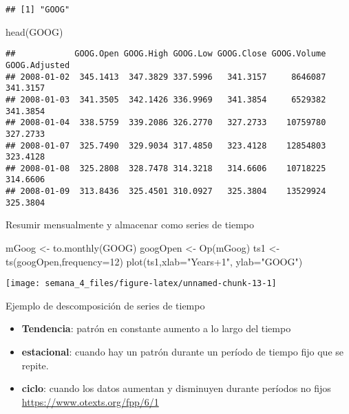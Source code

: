 \documentclass[
]{article}
\newenvironment{Shaded}{\begin{snugshade}}{\end{snugshade}}
\newcommand{\AttributeTok}[1]{\textcolor[rgb]{0.77,0.63,0.00}{#1}}
\newcommand{\DecValTok}[1]{\textcolor[rgb]{0.00,0.00,0.81}{#1}}
\newcommand{\FunctionTok}[1]{\textcolor[rgb]{0.00,0.00,0.00}{#1}}
\newcommand{\NormalTok}[1]{#1}
\newcommand{\OtherTok}[1]{\textcolor[rgb]{0.56,0.35,0.01}{#1}}
\newcommand{\StringTok}[1]{\textcolor[rgb]{0.31,0.60,0.02}{#1}}
\providecommand{\tightlist}{%
  \setlength{\itemsep}{0pt}\setlength{\parskip}{0pt}}
\begin{document}
\begin{verbatim}
## [1] "GOOG"
\end{verbatim}

\begin{Shaded}
\begin{Highlighting}[]
\FunctionTok{head}\NormalTok{(GOOG)}
\end{Highlighting}
\end{Shaded}

\begin{verbatim}
##            GOOG.Open GOOG.High GOOG.Low GOOG.Close GOOG.Volume GOOG.Adjusted
## 2008-01-02  345.1413  347.3829 337.5996   341.3157     8646087      341.3157
## 2008-01-03  341.3505  342.1426 336.9969   341.3854     6529382      341.3854
## 2008-01-04  338.5759  339.2086 326.2770   327.2733    10759780      327.2733
## 2008-01-07  325.7490  329.9034 317.4850   323.4128    12854803      323.4128
## 2008-01-08  325.2808  328.7478 314.3218   314.6606    10718225      314.6606
## 2008-01-09  313.8436  325.4501 310.0927   325.3804    13529924      325.3804
\end{verbatim}

Resumir mensualmente y almacenar como series de tiempo

\begin{Shaded}
\begin{Highlighting}[]
\NormalTok{mGoog }\OtherTok{\textless{}{-}} \FunctionTok{to.monthly}\NormalTok{(GOOG)}
\NormalTok{googOpen }\OtherTok{\textless{}{-}} \FunctionTok{Op}\NormalTok{(mGoog)}
\NormalTok{ts1 }\OtherTok{\textless{}{-}} \FunctionTok{ts}\NormalTok{(googOpen,}\AttributeTok{frequency=}\DecValTok{12}\NormalTok{)}
\FunctionTok{plot}\NormalTok{(ts1,}\AttributeTok{xlab=}\StringTok{"Years+1"}\NormalTok{, }\AttributeTok{ylab=}\StringTok{"GOOG"}\NormalTok{)}
\end{Highlighting}
\end{Shaded}

\begin{center}\texttt{[image: semana\_4\_files/figure-latex/unnamed-chunk-13-1]} \end{center}

Ejemplo de descomposición de series de tiempo

\begin{itemize}
\tightlist
\item
  \textbf{Tendencia}: patrón en constante aumento a lo largo del tiempo
\item
  \textbf{estacional}: cuando hay un patrón durante un período de tiempo
  fijo que se repite.
\item
  \textbf{ciclo}: cuando los datos aumentan y disminuyen durante
  períodos no fijos \url{https://www.otexts.org/fpp/6/1}
\end{itemize}
\end{document}
